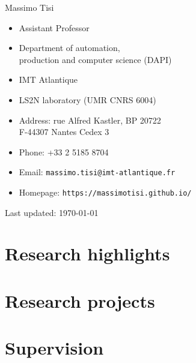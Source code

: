 \documentclass[10pt,letterpaper]{article}
\def\name{Massimo Tisi}
\begin{document}
{\huge \name}


\vspace{0.25in}
\begin{minipage}[t]{0.5\textwidth}
  \begin{itemize}
  \item Assistant Professor
  \item Department of automation,\\
    production and computer science (DAPI)
  \item IMT Atlantique
  \item LS2N laboratory (UMR CNRS 6004)
  \end{itemize}

\end{minipage}
\begin{minipage}[t]{0.5\textwidth}
  \begin{itemize}
  \item Address: rue Alfred Kastler, BP 20722 \\
  F-44307 Nantes Cedex 3
  \item Phone: +33 2 5185 8704
  \item Email: \texttt{massimo.tisi@imt-atlantique.fr}
  \item Homepage: \texttt{https://massimotisi.github.io/}
  \end{itemize}
\end{minipage}

\vfill
\tableofcontents

\vfill
\begin{center}
  \begin{small}
    Last updated: \today
  \end{small}
\end{center}

\newpage
\section{Research highlights}


\newpage
\section{Research projects}
{
  
}

\newpage  
\section{Supervision}
{
  \let\section\paragraph
  
}
 
\end{document}
